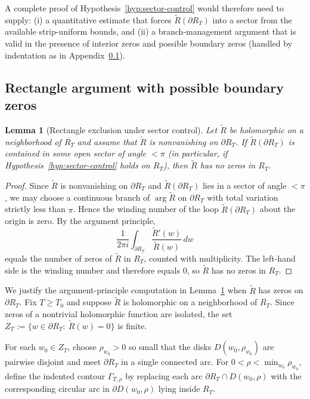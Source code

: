 \documentclass[11pt]{amsart}
\newtheorem{lemma}[theorem]{Lemma}
\theoremstyle{definition}
\theoremstyle{remark}
\begin{document}
\smallskip
\noindent
A complete proof of Hypothesis~\ref{hyp:sector-control} would therefore need to supply:
(i) a quantitative estimate that forces $\widetilde R(\partial R_T)$ into a sector from the available
strip-uniform bounds, and (ii) a branch-management argument that is valid in the presence of interior
zeros and possible boundary zeros (handled by indentation as in Appendix~\ref{app:rectangle-proof}).

\subsection{Rectangle argument with possible boundary zeros}\label{app:rectangle-proof}

\begin{lemma}[Rectangle exclusion under sector control]\label{lem:rectangle-exclusion}
Let $\widetilde R$ be holomorphic on a neighborhood of $\overline{R_T}$ and assume that
$\widetilde R$ is nonvanishing on $\partial R_T$. If $\widetilde R(\partial R_T)$ is contained in some
open sector of angle $<\pi$ (in particular, if Hypothesis~\ref{hyp:sector-control} holds on $R_T$), then
$\widetilde R$ has no zeros in $R_T$.
\end{lemma}

\begin{proof}
Since $\widetilde R$ is nonvanishing on $\partial R_T$ and $\widetilde R(\partial R_T)$ lies in a sector
of angle $<\pi$, we may choose a continuous branch of $\arg \widetilde R$ on $\partial R_T$ with total
variation strictly less than $\pi$. Hence the winding number of the loop $\widetilde R(\partial R_T)$
about the origin is zero. By the argument principle,
\[
\frac{1}{2\pi i}\int_{\partial R_T}\frac{\widetilde R'(w)}{\widetilde R(w)}\,dw
\]
equals the number of zeros of $\widetilde R$ in $R_T$, counted with multiplicity. The left-hand side is
the winding number and therefore equals $0$, so $\widetilde R$ has no zeros in $R_T$.
\end{proof}



We justify the argument-principle computation in Lemma~\ref{lem:rectangle-exclusion} when
$\widetilde R$ has zeros on $\partial R_T$. Fix $T\ge T_0$ and suppose $\widetilde R$ is holomorphic on a
neighborhood of $\overline{R_T}$. Since zeros of a nontrivial holomorphic function are isolated, the set
$Z_T:=\{w\in\partial R_T:\ \widetilde R(w)=0\}$ is finite.

For each $w_0\in Z_T$, choose $\rho_{w_0}>0$ so small that the disks $D(w_0,\rho_{w_0})$ are pairwise
disjoint and meet $\partial R_T$ in a single connected arc. For $0<\rho<\min_{w_0}\rho_{w_0}$, define the
indented contour $\Gamma_{T,\rho}$ by replacing each arc $\partial R_T\cap D(w_0,\rho)$ with the
corresponding circular arc in $\partial D(w_0,\rho)$ lying inside $R_T$.
\end{document}
